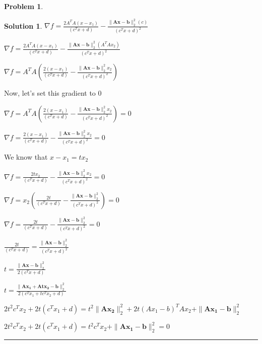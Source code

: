 \documentclass{article}
\theoremstyle{definition}
\newtheorem{problem}{Problem}
\def\fline{\rule{0.75\linewidth}{0.5pt}}
\newcommand{\finishline}{\begin{center}\fline\end{center}}
\newtheorem*{solution*}{Solution}
\newenvironment{solution}{\begin{solution*}}{{\finishline} \end{solution*}}
\begin{document}
\begin{problem}
\begin{enumerate}
\begin{solution}
        $\nabla f = \frac{2A^T A (x - x_1)}{(c^Tx + d)} - \frac{\|\mathbf{Ax - b}\|^2_2 (c)}{(c^Tx + d) ^ 2}$ \newline 

        $\nabla f = \frac{2A^T A (x - x_1)}{(c^Tx + d)} - \frac{\|\mathbf{Ax - b}\|^2_2 (A^T A x_2)}{(c^Tx + d) ^ 2}$ \newline 

        $\nabla f = A^T A (\frac{2 (x - x_1)}{(c^Tx + d)} - \frac{\|\mathbf{Ax - b}\|^2_2 x_2}{(c^Tx + d) ^ 2})$ \newline 

        Now, let's set this gradient to 0 \newline 

        $\nabla f = A^T A (\frac{2 (x - x_1)}{(c^Tx + d)} - \frac{\|\mathbf{Ax - b}\|^2_2 x_2}{(c^Tx + d) ^ 2}) = 0$ \newline 

        $\nabla f = \frac{2 (x - x_1)}{(c^Tx + d)} - \frac{\|\mathbf{Ax - b}\|^2_2 x_2}{(c^Tx + d) ^ 2} = 0$ \newline 

        We know that $x - x_1 = tx_2$ \newline 

        $\nabla f = \frac{2 tx_2}{(c^Tx + d)} - \frac{\|\mathbf{Ax - b}\|^2_2 x_2}{(c^Tx + d) ^ 2} = 0$ \newline 

         $\nabla f = x_2 (\frac{2 t}{(c^Tx + d)} - \frac{\|\mathbf{Ax - b}\|^2_2 }{(c^Tx + d) ^ 2}) = 0$ \newline 

         $\nabla f = \frac{2 t}{(c^Tx + d)} - \frac{\|\mathbf{Ax - b}\|^2_2 }{(c^Tx + d) ^ 2} = 0$ \newline 

         $\frac{2 t}{(c^Tx + d)}  = \frac{\|\mathbf{Ax - b}\|^2_2 }{(c^Tx + d) ^ 2}$ \newline 

         $t = \frac{\|\mathbf{Ax - b}\|^2_2 }{2(c^Tx + d)}$ \newline 

         $t = \frac{\|\mathbf{Ax_1 + Atx_2 - b}\|^2_2 }{2(c^Tx_1 + tc^Tx_2 + d)}$ \newline 


         $2t^2 c^Tx_2 + 2t(c^Tx_1 + d) = t^2 \|\mathbf{Ax_2}\|^2_2 + 2t(Ax_1 - b)^T Ax_2 +  \|\mathbf{Ax_1 - b}\|^2_2 $ \newline 

         $2t^2 c^Tx_2 + 2t(c^Tx_1 + d) = t^2 c^T x_2 +  \|\mathbf{Ax_1 - b}\|^2_2  = 0$ \newline 


\end{solution}
\end{enumerate}
\end{problem}
\end{document}
